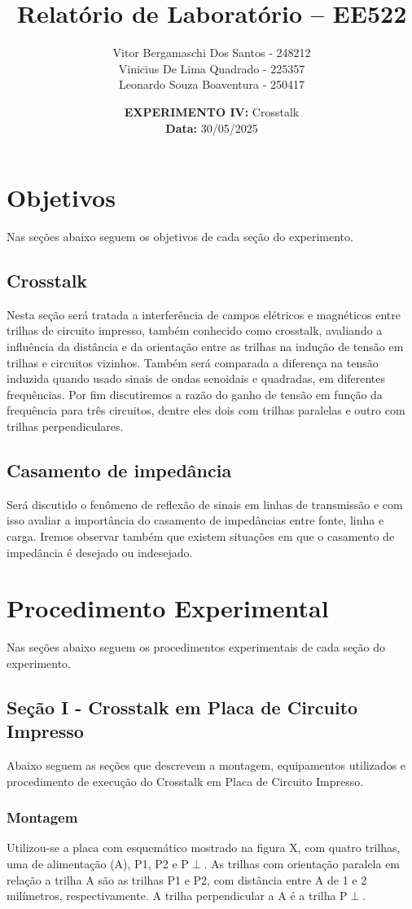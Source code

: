 \documentclass[12pt]{article}
\author{
  Vitor Bergamaschi Dos Santos - 248212\\
  Vinicius De Lima Quadrado - 225357\\
  Leonardo Souza Boaventura - 250417
}
\title{\textbf{Relatório de Laboratório -- EE522}}
\date{\textbf{EXPERIMENTO IV:} Crosstalk
\\ \textbf{Data:} 30/05/2025}
\begin{document}
\maketitle

\section{Objetivos}
Nas seções abaixo seguem os objetivos de cada seção do experimento.

\subsection{Crosstalk}
Nesta seção será tratada a interferência de campos elétricos e
magnéticos entre trilhas de circuito impresso, também conhecido como
crosstalk, avaliando a influência da distância e da orientação entre
as trilhas na indução de tensão em trilhas e circuitos vizinhos.
Também será comparada a diferença na tensão induzida quando usado
sinais de ondas senoidais e quadradas, em diferentes frequências.
Por fim discutiremos a razão do ganho de tensão em função da
frequência para três circuitos, dentre eles dois com trilhas
paralelas e outro com trilhas perpendiculares.

\subsection{Casamento de impedância}
Será discutido o fenômeno de reflexão de sinais em linhas de
transmissão e com isso avaliar a importância do casamento de
impedâncias entre fonte, linha e carga. Iremos observar também que
existem situações em que o casamento de impedância é desejado ou indesejado.

\section{Procedimento Experimental}
Nas seções abaixo seguem os procedimentos experimentais de cada seção
do experimento.

\subsection{Seção I - Crosstalk em Placa de Circuito Impresso}

Abaixo seguem as seções que descrevem a montagem, equipamentos
utilizados e procedimento de execução do Crosstalk em Placa de
Circuito Impresso.

\subsubsection{Montagem}
Utilizou-se a placa com esquemático mostrado na figura X, com quatro
trilhas, uma de alimentação (A), P1, P2 e P$\perp$.
As trilhas com orientação paralela em relação a trilha A são as
trilhas P1 e P2, com distância entre A de 1 e 2 milímetros,
respectivamente. A trilha perpendicular a A é a trilha P$\perp$.
\end{document}
